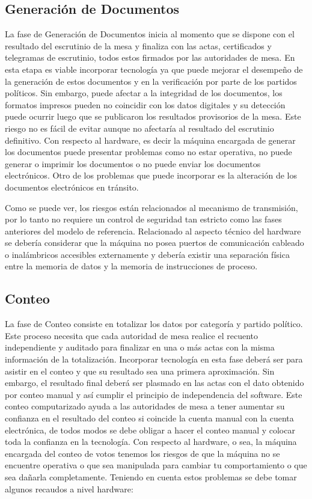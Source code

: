 \subsection{Generación de Documentos} 
La fase de Generación de Documentos inicia al momento que se dispone con el resultado del escrutinio de la mesa y finaliza con las actas, certificados y telegramas de escrutinio, todos estos firmados por las autoridades de mesa. En esta etapa es viable incorporar tecnología ya que puede mejorar el desempeño de la generación de estos documentos y en la verificación por parte de los partidos políticos. 
Sin embargo, puede afectar a la integridad de los documentos, los formatos impresos pueden no coincidir con los datos digitales y su detección puede ocurrir luego que se publicaron los resultados provisorios de la mesa. Este riesgo no es fácil de evitar aunque no afectaría al resultado del escrutinio definitivo. 
Con respecto al hardware, es decir la máquina encargada de generar los documentos puede presentar problemas como no estar operativa, no puede generar o imprimir los documentos o no puede enviar los documentos electrónicos. Otro de los problemas que puede incorporar es la alteración de los documentos electrónicos en tránsito.

Como se puede ver, los riesgos están relacionados al mecanismo de transmisión, por lo tanto no requiere un control de seguridad tan estricto como las fases anteriores del modelo de referencia. Relacionado al aspecto técnico del hardware se debería considerar que la máquina no posea puertos de comunicación cableado o inalámbricos accesibles externamente y debería existir una separación física entre la memoria de datos y la memoria de instrucciones de proceso. 

\subsection{Conteo} 
La fase de Conteo consiste en totalizar los datos por categoría y partido político. Este proceso necesita que cada autoridad de mesa realice el recuento independiente y auditado para finalizar en una o más actas con la misma información de la totalización. Incorporar tecnología en esta fase deberá ser para asistir en el conteo y que su resultado sea una primera aproximación. Sin embargo, el resultado final deberá ser plasmado en las actas con el dato obtenido por conteo manual y así cumplir el principio de independencia del software. Este conteo computarizado ayuda a las autoridades de mesa a tener aumentar su confianza en el resultado del conteo si coincide la cuenta manual con la cuenta electrónica, de todos modos se debe obligar a hacer el conteo manual y colocar toda la confianza en la tecnología.
Con respecto al hardware, o sea, la máquina encargada del conteo de votos tenemos los riesgos de que la máquina no se encuentre operativa o que sea manipulada para cambiar tu comportamiento o que sea dañarla completamente. Teniendo en cuenta estos problemas se debe tomar algunos recaudos a nivel hardware:

